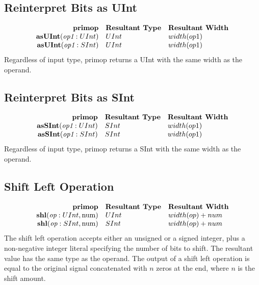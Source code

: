 \documentclass[12pt]{article}
\begin{document}
\subsection{Reinterpret Bits as UInt}
\[
\begin{array}{rll}
\text{\bf primop} & \text{\bf Resultant Type} & \text{\bf Resultant Width} \\
\text{\bf asUInt}(\text{\em op1}:UInt)       & UInt & width(op1) \\
\text{\bf asUInt}(\text{\em op1}:SInt)       & UInt & width(op1) \\
\end{array}
\]
Regardless of input type, primop returns a UInt with the same width as the operand.

\subsection{Reinterpret Bits as SInt}
\[
\begin{array}{rll}
\text{\bf primop} & \text{\bf Resultant Type} & \text{\bf Resultant Width} \\
\text{\bf asSInt}(\text{\em op1}:UInt)     & SInt & width(op1) \\
\text{\bf asSInt}(\text{\em op1}:SInt)     & SInt & width(op1) \\
\end{array}
\]
Regardless of input type, primop returns a SInt with the same width as the operand.

\subsection{Shift Left Operation}
\[
\begin{array}{rll}
\text{\bf primop} & \text{\bf Resultant Type} & \text{\bf Resultant Width} \\
\text{\bf shl}(\text{\em op}:UInt, \text{num})      & UInt & width(op) + num \\
\text{\bf shl}(\text{\em op}:SInt, \text{num})      & SInt & width(op) + num \\
\end{array}
\]
The shift left operation accepts either an unsigned or a signed integer, plus a non-negative integer literal specifying the number of bits to shift.
The resultant value has the same type as the operand.
The output of a shift left operation is equal to the original signal concatenated with $n$ zeros at the end, where $n$ is the shift amount.
\end{document}
